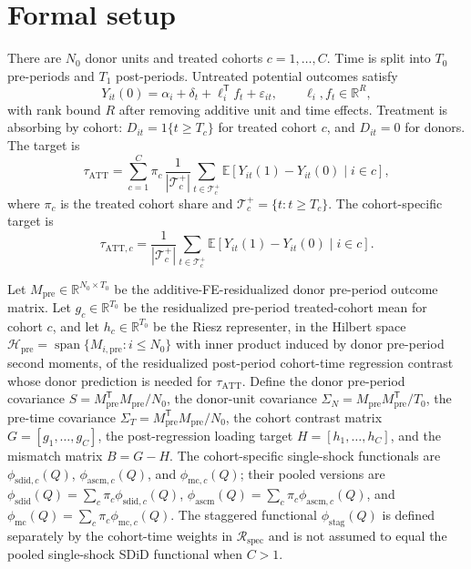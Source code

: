\documentclass[11pt]{article}
\newcommand{\E}{\mathbb{E}}
\newcommand{\transpose}{\mathsf{T}}
\newcommand{\calH}{\mathcal{H}}
\newcommand{\R}{\mathbb{R}}
\theoremstyle{definition}
\theoremstyle{plain}
\theoremstyle{remark}
\begin{document}
\section{Formal setup}
There are \(N_0\) donor units and treated cohorts \(c=1,\ldots,C\).  Time is split into \(T_0\) pre-periods and \(T_1\) post-periods.  Untreated potential outcomes satisfy
\[
Y_{it}(0)=\alpha_i+\delta_t+\ell_i^\transpose f_t+\varepsilon_{it},
\qquad
\ell_i,f_t\in\R^R,
\]
with rank bound \(R\) after removing additive unit and time effects.  Treatment is absorbing by cohort: \(D_{it}=1\{t\ge T_c\}\) for treated cohort \(c\), and \(D_{it}=0\) for donors.  The target is
\[
\tau_{\mathrm{ATT}}
=\sum_{c=1}^C \pi_c\,\frac{1}{|\mathcal T_c^+|}\sum_{t\in\mathcal T_c^+}
\E[Y_{it}(1)-Y_{it}(0)\mid i\in c],
\]
where \(\pi_c\) is the treated cohort share and \(\mathcal T_c^+=\{t:t\ge T_c\}\).  The cohort-specific target is
\[
\tau_{\mathrm{ATT},c}
=\frac{1}{|\mathcal T_c^+|}\sum_{t\in\mathcal T_c^+}
\E[Y_{it}(1)-Y_{it}(0)\mid i\in c].
\]

Let \(M_{\mathrm{pre}}\in\R^{N_0\times T_0}\) be the additive-FE-residualized donor pre-period outcome matrix.  Let \(g_c\in\R^{T_0}\) be the residualized pre-period treated-cohort mean for cohort \(c\), and let \(h_c\in\R^{T_0}\) be the Riesz representer, in the Hilbert space \(\calH_{\mathrm{pre}}=\operatorname{span}\{M_{i,\mathrm{pre}}:i\le N_0\}\) with inner product induced by donor pre-period second moments, of the residualized post-period cohort-time regression contrast whose donor prediction is needed for \(\tau_{\mathrm{ATT}}\).  Define the donor pre-period covariance \(S=M_{\mathrm{pre}}^\transpose M_{\mathrm{pre}}/N_0\), the donor-unit covariance \(\Sigma_N=M_{\mathrm{pre}}M_{\mathrm{pre}}^\transpose/T_0\), the pre-time covariance \(\Sigma_T=M_{\mathrm{pre}}^\transpose M_{\mathrm{pre}}/N_0\), the cohort contrast matrix \(G=[g_1,\ldots,g_C]\), the post-regression loading target \(H=[h_1,\ldots,h_C]\), and the mismatch matrix \(B=G-H\).  The cohort-specific single-shock functionals are \(\phi_{\mathrm{sdid},c}(Q)\), \(\phi_{\mathrm{ascm},c}(Q)\), and \(\phi_{\mathrm{mc},c}(Q)\); their pooled versions are \(\phi_{\mathrm{sdid}}(Q)=\sum_c\pi_c\phi_{\mathrm{sdid},c}(Q)\), \(\phi_{\mathrm{ascm}}(Q)=\sum_c\pi_c\phi_{\mathrm{ascm},c}(Q)\), and \(\phi_{\mathrm{mc}}(Q)=\sum_c\pi_c\phi_{\mathrm{mc},c}(Q)\).  The staggered functional \(\phi_{\mathrm{stag}}(Q)\) is defined separately by the cohort-time weights in \(\mathcal R_{\mathrm{spec}}\) and is not assumed to equal the pooled single-shock SDiD functional when \(C>1\).
\end{document}
